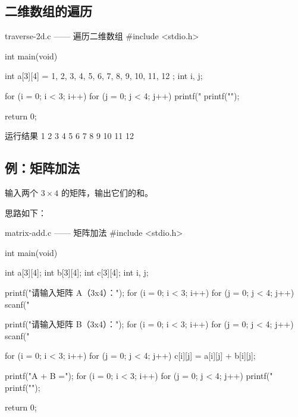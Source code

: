 \subsection{二维数组的遍历}

\begin{codebox}{traverse-2d.c —— 遍历二维数组}
#include <stdio.h>

int main(void)
{
    int a[3][4] = {
        {1, 2, 3, 4},
        {5, 6, 7, 8},
        {9, 10, 11, 12}
    };
    int i, j;

    for (i = 0; i < 3; i++) {
        for (j = 0; j < 4; j++) {
            printf("%
        }
        printf("\n");
    }

    return 0;
}
\end{codebox}

\begin{outbox}{运行结果}
   1   2   3   4
   5   6   7   8
   9  10  11  12
\end{outbox}

\subsection{例：矩阵加法}

\begin{example}
输入两个 $3 \times 4$ 的矩阵，输出它们的和。
\end{example}
\begin{solution}
思路如下：

\begin{codebox}{matrix-add.c —— 矩阵加法}
#include <stdio.h>

int main(void)
{
    int a[3][4];
    int b[3][4];
    int c[3][4];
    int i, j;

    printf("请输入矩阵 A（3x4）：\n");
    for (i = 0; i < 3; i++) {
        for (j = 0; j < 4; j++) {
            scanf("%
        }
    }

    printf("请输入矩阵 B（3x4）：\n");
    for (i = 0; i < 3; i++) {
        for (j = 0; j < 4; j++) {
            scanf("%
        }
    }

    for (i = 0; i < 3; i++) {
        for (j = 0; j < 4; j++) {
            c[i][j] = a[i][j] + b[i][j];
        }
    }

    printf("A + B =\n");
    for (i = 0; i < 3; i++) {
        for (j = 0; j < 4; j++) {
            printf("%
        }
        printf("\n");
    }

    return 0;
}
\end{codebox}
\end{solution}

